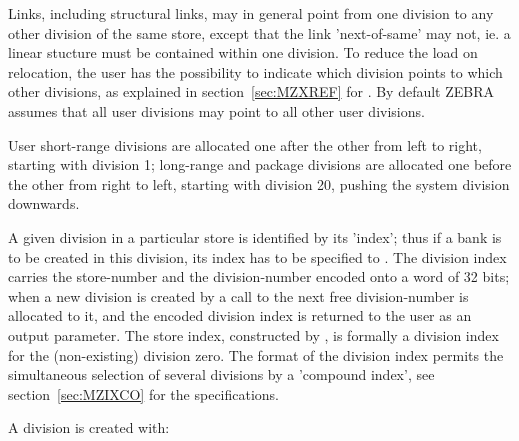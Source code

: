 Links, including structural links,
may in general point from one division to any other division
of the same store,
except that the link 'next-of-same' may not,
ie. a linear stucture must be contained within one division.
To reduce the load on relocation,
the user has the possibility to indicate which division points
to which other divisions,
as explained in section~\ref{sec:MZXREF} for .
By default ZEBRA assumes that all user divisions may point
to all other user divisions.

User short-range divisions are allocated one after the other
from left to right, starting with division 1;
long-range and package divisions
are allocated one before the other from right to left,
starting with division 20, pushing the system division downwards.

A given division in a particular store is identified by its 'index';
thus if a bank is to be created in this division,
its index has to be specified to .
The division index carries the store-number and the division-number
encoded onto a word of 32 bits;
when a new division is created by a call to  the next free
division-number is allocated to it,
and the encoded division index is returned to the user as
an output parameter.
The store index, constructed by , is formally a division index
for the (non-existing) division zero.
The format of the division index permits the simultaneous selection
of several divisions by a 'compound index',
see section~\ref{sec:MZIXCO} for the specifications.

A division is created with:


